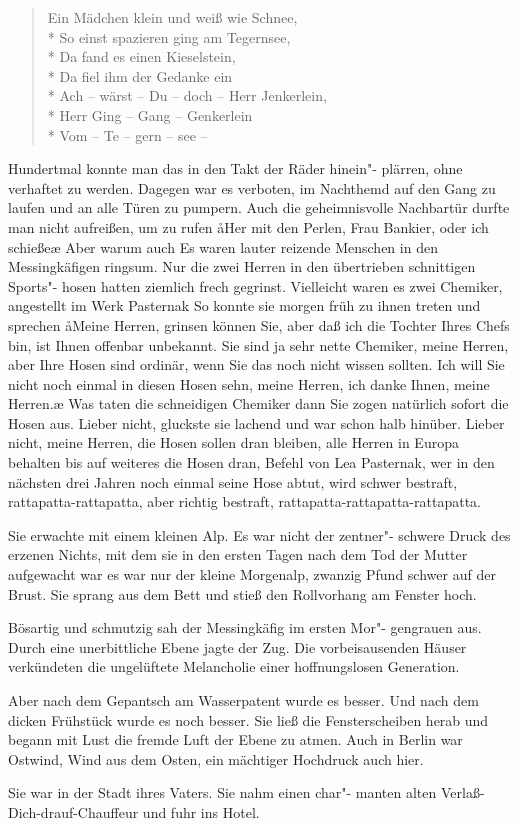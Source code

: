 \begin{verse}Ein Mädchen klein und weiß wie Schnee,\\*
So einst spazieren ging am Tegernsee,\\*
Da fand es einen Kieselstein,\\*
Da fiel ihm der Gedanke ein\dopp{}\\*
Ach -- wärst -- Du -- doch -- Herr Jenkerlein,\\*
Herr Ging -- Gang -- Genkerlein\\*
Vom -- Te -- gern -- see --
\end{verse}

\noindent{}Hundertmal konnte man das in den Takt der Räder hinein"-%
plärren, ohne verhaftet zu werden. Dagegen war es verboten,
im Nachthemd auf den Gang zu laufen und an alle Türen
zu pumpern. Auch die geheimnisvolle Nachbartür durfte
man nicht aufreißen, um zu rufen\dopp{} \aa{}Her mit den Perlen, Frau
Bankier, oder ich schieße\ausr{}\ae{} Aber warum auch\frag{} Es waren
lauter reizende Menschen in den Messingkäfigen ringsum.
Nur die zwei Herren in den übertrieben schnittigen Sports"-%
hosen hatten ziemlich frech gegrinst. Vielleicht waren es zwei
Chemiker, angestellt im Werk Pasternak\frag{} So konnte sie morgen
früh zu ihnen treten und sprechen\dopp{} \aa{}Meine Herren, grinsen
können Sie, aber daß ich die Tochter Ihres Chefs bin, ist
Ihnen offenbar unbekannt. Sie sind ja sehr nette Chemiker,
meine Herren, aber Ihre Hosen sind ordinär, wenn Sie das
noch nicht wissen sollten. Ich will Sie nicht noch einmal in
diesen Hosen sehn, meine Herren, ich danke Ihnen, meine
Herren.\ae{} Was taten die schneidigen Chemiker dann\frag{} Sie
zogen natürlich sofort die Hosen aus. Lieber nicht, gluckste
sie lachend und war schon halb hinüber. Lieber nicht, meine
Herren, die Hosen sollen dran bleiben, alle Herren in Europa
behalten bis auf weiteres die Hosen dran, Befehl von Lea
Pasternak, wer in den nächsten drei Jahren noch einmal seine
Hose abtut, wird schwer bestraft, rattapatta-rattapatta, aber
richtig bestraft, rattapatta-rattapatta-rattapatta.

Sie erwachte mit einem kleinen Alp. Es war nicht der zentner"-%
schwere Druck des erzenen Nichts, mit dem sie in den ersten
Tagen nach dem Tod der Mutter aufgewacht war\semi{} es war
nur der kleine Morgenalp, zwanzig Pfund schwer auf der
Brust. Sie sprang aus dem Bett und stieß den Rollvorhang
am Fenster hoch.

Bösartig und schmutzig sah der Messingkäfig im ersten Mor"-%
gengrauen aus. Durch eine unerbittliche Ebene jagte der Zug.
Die vorbeisausenden Häuser verkündeten die ungelüftete
Melancholie einer hoffnungslosen Generation.

Aber nach dem Gepantsch am Wasserpatent wurde es besser.
Und nach dem dicken Frühstück wurde es noch besser. Sie ließ
die Fensterscheiben herab und begann mit Lust die fremde
Luft der Ebene zu atmen. Auch in Berlin war Ostwind, Wind
aus dem Osten, ein mächtiger Hochdruck auch hier.

Sie war in der Stadt ihres Vaters. Sie nahm einen char"-%
manten alten Verlaß-Dich-drauf-Chauffeur und fuhr ins
Hotel.